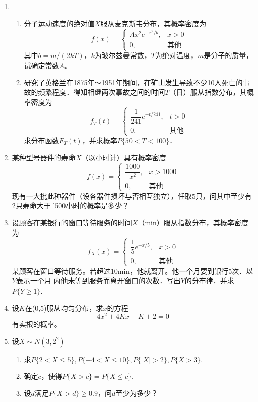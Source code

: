 \documentclass[10pt,a4paper]{article}
\begin{document}
\begin{enumerate}
    \item \begin{enumerate}
        \item 分子运动速度的绝对值$X$服从麦克斯韦分布，其概率密度为
        $$f(x)=\left\{\begin{array}{ll}
            Ax^2e^{-x^2/b}, & x>0\\
            0, & \mbox{其他}
        \end{array}\right.$$
        其中$b=m/(2kT)$，$k$为玻尔兹曼常数，$T$为绝对温度，$m$是分子的质量，试确定常数$A$。
        \item 研究了英格兰在1875年～1951年期间，在矿山发生导致不少10人死亡的事
        故的频繁程度．得知相继两次事故之间的时间$T$（日）服从指数分布，其概率密度为
        $$f_T(t)=\left\{\begin{array}{ll}
            \dfrac{1}{241}e^{-t/241}, & t>0\\
            0, & \mbox{其他}
        \end{array}\right.$$
        求分布函数$F_T(t)$，并求概率$P\{50<T<100\}$．
    \end{enumerate}
    

    \item 某种型号器件的寿命$X$（以小时计）具有概率密度
    $$f(x)=\left\{\begin{array}{ll}
        \dfrac{1000}{x^2}, & x>1000\\
        0, & \mbox{其他}
    \end{array}\right.$$
    现有一大批此种器件（设各器件损坏与否相互独立），任取5只，问其中至少有2只寿命大于
    l500小时的概率是多少？


    \item 设顾客在某银行的窗口等待服务的时间$X$（min）服从指数分布，其概率密度为
    $$f_X(x)=\left\{
        \begin{array}{ll}
            \dfrac{1}{5}e^{-x/5}, & x>0\\
            0, & \mbox{其他}
        \end{array}
    \right.$$
    某顾客在窗口等待服务。若超过10min，他就离开。他一个月要到银行5次．以$Y$表示一个月
    内他未等到服务而离开窗口的次数．写出$Y$的分布律．并求$P\{Y\geq 1\}$.


    \item 设$K$在(0,5)服从均匀分布，求$x$的方程
    $$4x^2+4Kx+K+2=0$$
    有实根的概率。


    \item 设$X\sim N(3,2^2)$
    \begin{enumerate}
        \item 求$P\{2<X\leq 5\},P\{-4<X\leq 10\},P\{|X|>2\},P\{X>3\}$.
        \item 确定$c$，使得$P\{X>c\}=P\{X\leq c\}$.
        \item 设$d$满足$P\{X>d\}\geq 0.9$，问$d$至少为多少？
    \end{enumerate}



\end{enumerate}
\end{document}
